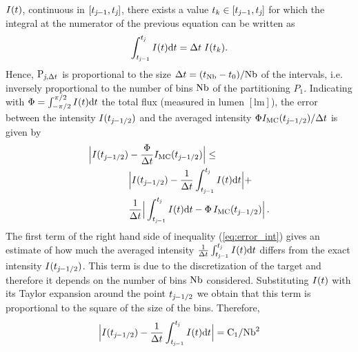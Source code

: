 $I(t)$, continuous in $[t_{\textit{j}-1}, t_{\textit{j}}]$, there exists a value $t_{k}\in[t_{\textit{j}-1}, t_{\textit{j}}]$ for which the integral at the numerator of the previous equation can be written as
 \begin{equation}
\int_{t_{\textit{j}-1}}^{t_{\textit{j}}} I(t) \textrm{d}t = \Delta t\;I(t_{k}).
\end{equation}
Hence, $\textrm{P}_{\textit{j}, \Delta t}$ is proportional to the size $\Delta t= (t_{\textrm{Nb}}-t_{0})/{\textrm{Nb}}$
of the intervals, i.e. inversely proportional to the number of bins $\textrm{Nb}$ of the partitioning $P_1$.
Indicating with $\Phi = \int_{-\pi/2}^{\pi/2}I(t) \textrm{d}t$ the total flux (measured in lumen $[\textrm{lm}]$),
the error between the intensity $I(t_{\textit{j}-1/2})$
 and the averaged  intensity $\Phi I_{\textrm{MC}}(t_{\textit{j}-1/2})/\Delta t$ is given by
\begin{equation}\label{eq:error_int}
\begin{aligned}
\Big|I(t_{\textit{j}-1/2})&-\frac{\Phi}
{\Delta t}I_{\textrm{MC}}(t_{\textit{j}-1/2})\Big| \leq\\
 &\Big|I(t_{\textit{j}-1/2})-\frac{1}{\Delta t}\int_{t_{\textit{j}-1}}^{t_{\textit{j}}} I(t)\textrm{d}t\Big|+\\
&\frac{1}{\Delta t}\Big|\int_{t_{\textit{j}-1}}^{t_{\textit{j}}} I(t)\textrm{d}t-
\Phi\, I_{\textrm{MC}}(t_{\textit{j}-1/2})\Big| \,.
\end{aligned}
\end{equation}
\indent The first term of the right hand side of inequality (\ref{eq:error_int}) gives an estimate of how much the averaged intensity
 $\frac{1}{\Delta t}\int_{t_{\textit{j}-1}}^{t_{\textit{j}}} I(t)\textrm{d}t$ differs from the exact intensity $I(t_{\textit{j}-1/2})$.
This term is due to the discretization of the target and therefore it depends on the number of bins $\textrm{Nb}$ considered.
  Substituting $I(t)$ with its Taylor expansion around the point $t_{\textit{j}-1/2}$ we obtain that this term is proportional to the square of the size of the bins. 
Therefore,
\begin{equation}\Big|I(t_{\textit{j}-1/2})-\frac{1}{\Delta t}\int_{t_{\textit{j}-1}}^{t_{\textit{j}}} I(t)\textrm{d}t\Big| = \textrm{C}_1/\textrm{Nb}^2\end{equation}
